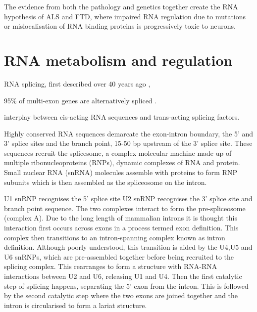 The evidence from both the pathology and genetics together create the RNA hypothesis of ALS and FTD, where impaired RNA regulation due to mutations or mislocalisation of RNA binding proteins is progressively toxic to neurons.

\section{RNA metabolism and regulation}

RNA splicing, first described over 40 years ago \citep{Berget1977,Chow1977}, 

95\% of multi-exon genes are alternatively spliced \citep{Pan2008,Wang2008}.

interplay between cis-acting RNA sequences and trans-acting splicing factors.

Highly conserved RNA sequences demarcate the exon-intron boundary, the 5' and 3' splice sites and the branch point, 15-50 bp upstream of the 3' splice site.
These sequences recruit the splicesome, a complex molecular machine made up of multiple ribonucleoproteins (RNPs), dynamic complexes of RNA and protein.
Small nuclear RNA (snRNA) molecules  assemble with proteins to form RNP subunits which is then assembled as the spliceosome on the intron.

U1 snRNP recognises the 5' splice site
U2 snRNP recognises the 3' splice site and branch point sequence.
The two complexes interact to form the pre-spliceosome (complex A).
Due to the long length of mammalian introns it is thought this interaction first occurs across exons in a process termed exon definition.
This complex then transitions to an intron-spanning complex known as intron definition.
Although poorly understood, this transition is aided by the U4,U5 and U6 snRNPs, which are pre-assembled together before being recruited to the splicing complex.
This rearranges to form a structure with RNA-RNA interactions between U2 and U6, releasing U1 and U4.
Then the first catalytic step of splicing happens, separating the 5' exon from the intron.
This is followed by the second catalytic step where the two exons are joined together and the intron is circularised to form a lariat structure.

